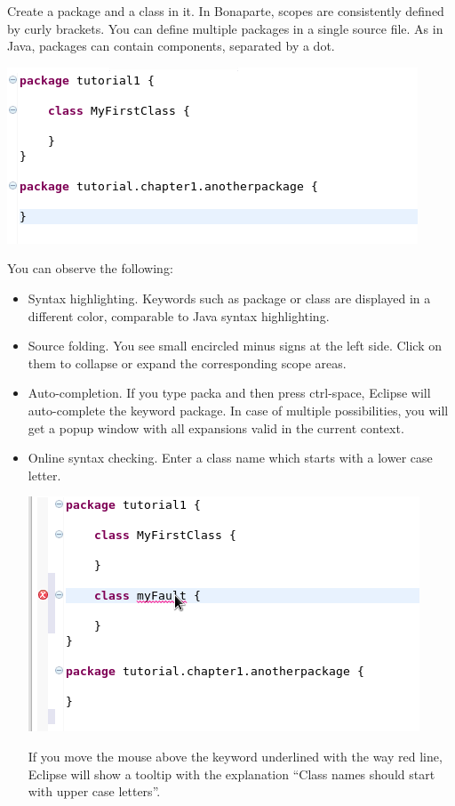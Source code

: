 \documentclass[11pt,a4paper,oneside]{article}
\begin{document}
Create a package and a class in it. In Bonaparte, scopes are consistently defined by curly brackets. You can define multiple packages in a single source file.
As in Java, packages can contain components, separated by a dot.

\vspace{2mm}
\begin{center}
\includegraphics[scale=0.5]{images/tut1-001.png}
\end{center} 

You can observe the following:
\begin{itemize}
  \item Syntax highlighting. Keywords such as {\ttfamily package} or {\ttfamily class} are displayed in a different color,
  comparable to Java syntax highlighting.
  \item Source folding. You see small encircled minus signs at the left side. Click on them to collapse or expand the corresponding scope areas.
  \item Auto-completion.  If you type {\ttfamily packa} and then press ctrl-space, Eclipse will auto-complete the keyword {\ttfamily package}.
  In case of multiple possibilities, you will get a popup window with all expansions valid in the current context. 
  \item Online syntax checking. Enter a class name which starts with a lower case letter.  
\vspace{2mm}
\begin{center}
\includegraphics[scale=0.5]{images/tut1-002.png}
\end{center} 
    If you move the mouse above the keyword underlined with the way red line, Eclipse will show a tooltip with the explanation
     ``Class names should start with upper case letters''. 
 
\end{itemize}
\end{document}
